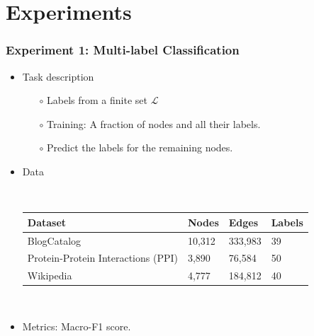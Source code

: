 \documentclass[notes, 10pt, aspectratio=169]{beamer}
\begin{document}
\section{Experiments}
\begin{frame}
    \frametitle{Experiment 1: Multi-label Classification}
    \begin{itemize}
        \item Task description
            \begin{itemize}
                \item[$\circ$] Labels from a finite set $\mathcal{L}$
                \item[$\circ$] Training: A fraction of nodes and all their labels.
                \item[$\circ$] Predict the labels for the remaining nodes.
            \end{itemize}
        \item Data\par
            ~\\
            \begin{tabular}{llll}
                \toprule
                \textbf{Dataset} & \textbf{Nodes} & \textbf{Edges} & \textbf{Labels}\\
                \midrule
                BlogCatalog & 10,312 & 333,983 & 39\\
                Protein-Protein Interactions (PPI) & 3,890 & 76,584 & 50\\
                Wikipedia & 4,777 & 184,812 & 40\\
                \bottomrule
            \end{tabular}
            \par~\\
        \item Metrics: Macro-F1 score.
    \end{itemize}
\end{frame}
\end{document}
